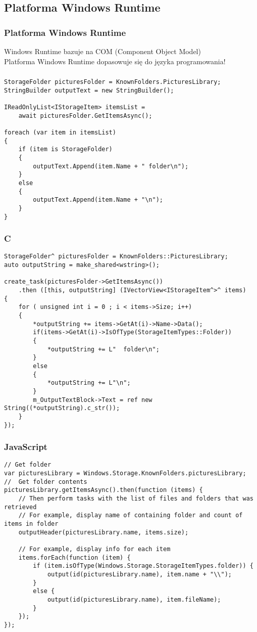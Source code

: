 \documentclass{beamer}
\def\ifmonospace{\ifdim\fontdimen3\font=0pt }
\def\C++{{C\nolinebreak[4]\hspace{-.05em}\raisebox{.4ex}{\tiny\bf ++}}}
\def\Csharp{%
\ifmonospace%
    C\#%
\else%
    C\kern-.1667em\raise.30ex\hbox{\smaller{\#}}%
\fi%
\spacefactor1000 }
\begin{document}
\subsection{Platforma Windows Runtime}
\begin{frame}[fragile]
\frametitle{Platforma Windows Runtime}
Windows Runtime bazuje na COM (Component Object Model)
\\
Platforma Windows Runtime dopasowuje się do języka programowania!
\end{frame}

\begin{frame}[fragile]
\frametitle{\Csharp}
 \begin{lstlisting}
StorageFolder picturesFolder = KnownFolders.PicturesLibrary;
StringBuilder outputText = new StringBuilder();

IReadOnlyList<IStorageItem> itemsList = 
    await picturesFolder.GetItemsAsync();

foreach (var item in itemsList)
{
    if (item is StorageFolder)
    {
        outputText.Append(item.Name + " folder\n");
    }
    else
    {
        outputText.Append(item.Name + "\n");
    }
}
    \end{lstlisting}  
\end{frame}

\begin{frame}[fragile]
\frametitle{\C++}
 \begin{lstlisting}
StorageFolder^ picturesFolder = KnownFolders::PicturesLibrary;
auto outputString = make_shared<wstring>();

create_task(picturesFolder->GetItemsAsync())        
    .then ([this, outputString] (IVectorView<IStorageItem^>^ items)
{        
    for ( unsigned int i = 0 ; i < items->Size; i++)
    {
        *outputString += items->GetAt(i)->Name->Data();
        if(items->GetAt(i)->IsOfType(StorageItemTypes::Folder))
        {
            *outputString += L"  folder\n";
        }
        else
        {
            *outputString += L"\n";
        }
        m_OutputTextBlock->Text = ref new String((*outputString).c_str());
    }
});
    \end{lstlisting}  
\end{frame}

\begin{frame}[fragile]
\frametitle{JavaScript}
\begin{lstlisting}
// Get folder
var picturesLibrary = Windows.Storage.KnownFolders.picturesLibrary;
//  Get folder contents
picturesLibrary.getItemsAsync().then(function (items) {
    // Then perform tasks with the list of files and folders that was retrieved
    // For example, display name of containing folder and count of items in folder
    outputHeader(picturesLibrary.name, items.size);

    // For example, display info for each item
    items.forEach(function (item) { 
        if (item.isOfType(Windows.Storage.StorageItemTypes.folder)) { 
            output(id(picturesLibrary.name), item.name + "\\"); 
        } 
        else { 
            output(id(picturesLibrary.name), item.fileName); 
        } 
    }); 
});
\end{lstlisting}
\end{frame}
\end{document}

